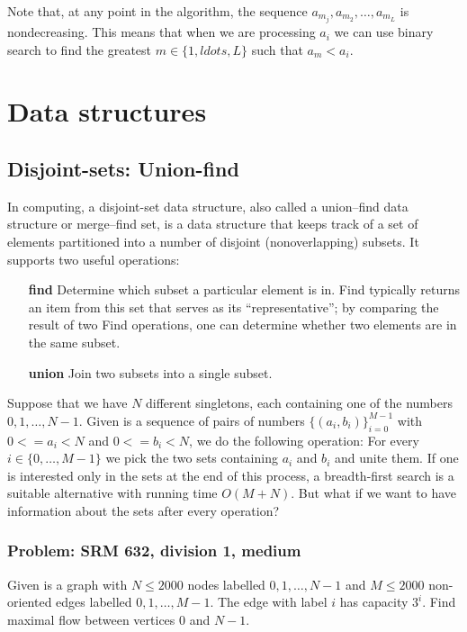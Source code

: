 \documentclass[a4paper, twoside,openany]{book}
\newcommand{\insertcode}[2]{\begin{itemize}\item[]\end{itemize}} %
\begin{document}
Note that, at any point in the algorithm, the sequence $a_{m_j}, a_{m_2}, \ldots, a_{m_L}$
is nondecreasing. This means that when we are processing $a_i$ we can use binary search to find the greatest $m \in \{ 1, ldots, L \}$ such that $a_m < a_i$.


\insertcode{"codes/longest_increasing_subsequence.cpp"}{algorithm}

\chapter{Data structures}
\section{Disjoint-sets: Union-find}
In computing, a disjoint-set data structure, also called a union–find data structure or merge–find set, is a data structure that keeps track of a set of elements partitioned into a number of disjoint (nonoverlapping) subsets. It supports two useful operations:
\begin{enumerate}
\item[\bf find] Determine which subset a particular element is in. Find typically returns an item from this set that serves as its ``representative''; by comparing the result of two Find operations, one can determine whether two elements are in the same subset.
\item[\bf union] Join two subsets into a single subset.
\end{enumerate}

Suppose that we have $N$ different singletons, each containing one of the numbers $0, 1, \ldots, N-1$. Given is a sequence of pairs of numbers $\{(a_i, b_i)\}_{i=0}^{M-1}$ with $0 <= a_i <  N$ and $0 <= b_i <  N$, we do the following operation: For every $i \in \{0, \ldots, M-1\}$ we pick the two sets containing $a_i$ and $b_i$ and unite them. If one is interested only in the sets at the end of this process, a breadth-first search is a suitable alternative with running time $O(M+N)$. But what if we want to have information about the sets after every operation?

\insertcode{"codes/union_find.cpp"}{A union-find algorithm with only \emph{path compression}.}

\insertcode{"codes/union_find_rank.cpp"}{A union-find algorithm with \emph{path compression} and \emph{union by rank}.}

\subsection{Problem: SRM 632, division 1, medium}
Given is a graph with $N \leq 2000$ nodes labelled $0, 1, \ldots, N-1$ and $M \leq 2000$ non-oriented edges labelled $0, 1, \ldots, M-1$. 
The edge with label $i$ has capacity $3^i$. 
Find maximal flow between vertices $0$ and $N-1$.
\end{document}
